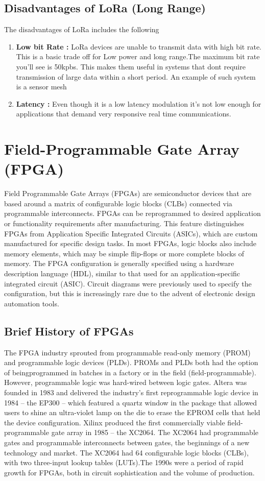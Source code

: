 \subsection{Disadvantages of LoRa (Long Range)}
The disadvantages of LoRa includes the following
\begin{enumerate}
\item \textbf{Low bit Rate :} LoRa devices are unable to transmit data with high bit rate. This is a basic trade off for Low power and long range.The maximum bit rate you’ll see is 50kpbs. This makes them useful in systems that dont require transmission of large data within a short period. An example of such system is a sensor mesh 
\item \textbf{Latency  :} Even though it is a low latency modulation it’s not low enough for applications that demand very responsive real time communications.
\end{enumerate}



\section[FPGA]{Field-Programmable Gate Array (FPGA)}
Field Programmable Gate Arrays (FPGAs) are semiconductor devices that are based around a matrix of configurable logic blocks (CLBs) connected via programmable interconnects. FPGAs can be reprogrammed to desired application or functionality requirements after manufacturing. This feature distinguishes FPGAs from Application Specific Integrated Circuits (ASICs), which are custom manufactured for specific design tasks. In most FPGAs, logic blocks also include memory elements, which may be simple flip-flops or more complete blocks of memory.  The FPGA configuration is generally specified using a hardware description language (HDL), similar to that used for an application-specific integrated circuit (ASIC). Circuit diagrams were previously used to specify the configuration, but this is increasingly rare due to the advent of electronic design automation tools.
\subsection{Brief History of FPGAs}
The FPGA industry sprouted from programmable read-only memory (PROM) and
programmable logic devices (PLDs). PROMs and PLDs both had the option of beingprogrammed in batches in a factory or in the field (field-programmable). However, programmable logic was hard-wired between logic gates. Altera was founded in 1983 and delivered the industry's first reprogrammable logic device in 1984 – the EP300 – which
featured a quartz window in the package that allowed users to shine an ultra-violet lamp on
the die to erase the EPROM cells that held the device configuration.
Xilinx produced the first commercially viable field-programmable gate array in 1985 – the
XC2064. The XC2064 had programmable gates and programmable interconnects between
gates, the beginnings of a new technology and market. The XC2064 had 64 configurable logic
blocks (CLBs), with two three-input lookup tables (LUTs).The 1990s were a period of rapid
growth for FPGAs, both in circuit sophistication and the volume of production.

